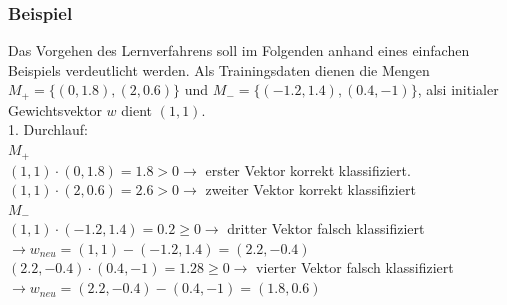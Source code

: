 \documentclass[fontsize=11pt]{scrartcl}
\begin{document}
                    \subsubsection{Beispiel}
                        Das Vorgehen des Lernverfahrens soll im Folgenden anhand eines einfachen Beispiels verdeutlicht werden.
                        \newline
                        Als Trainingsdaten dienen die Mengen $M_+ = \{(0,1.8),(2,0.6)\}$ und \newline $M_- = \{(-1.2,1.4),(0.4,-1)\}$, alsi initialer Gewichtsvektor $w$ dient $(1,1)$.\\
                        1. Durchlauf:\\
                        $M_+$\\
                        $(1,1)\cdot(0,1.8) = 1.8 > 0 \rightarrow $ erster Vektor korrekt klassifiziert.\\
                        $(1,1)\cdot(2,0.6) = 2.6 > 0 \rightarrow$ zweiter Vektor korrekt klassifiziert\\
                        $M_-$\\
                        $(1,1)\cdot(-1.2,1.4) = 0.2 \geq 0 \rightarrow$ dritter Vektor falsch klassifiziert\\
                        $\rightarrow w_{neu} = (1,1)-(-1.2,1.4) = (2.2,-0.4)$\\
                        $(2.2,-0.4) \cdot (0.4,-1) = 1.28 \geq 0 \rightarrow$ vierter Vektor falsch klassifiziert\\
                        $\rightarrow w_{neu} = (2.2,-0.4)-(0.4,-1) = (1.8,0.6)$
\end{document}
